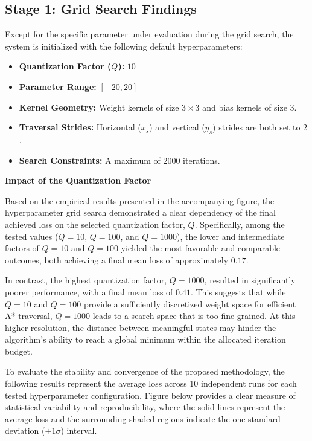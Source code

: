 \subsection{Stage 1: Grid Search Findings}

\noindent Except for the specific parameter under evaluation during the grid search, the system is initialized with the following default hyperparameters:

\begin{itemize}
    \item \textbf{Quantization Factor ($Q$):} $10$
    \item \textbf{Parameter Range:} $[-20, 20]$
    \item \textbf{Kernel Geometry:} Weight kernels of size $3 \times 3$ and bias kernels of size $3$.
    \item \textbf{Traversal Strides:} Horizontal ($x_s$) and vertical ($y_s$) strides are both set to $2$.
    \item \textbf{Search Constraints:} A maximum of $2000$ iterations.
\end{itemize}

\noindent \textbf{Impact of the Quantization Factor}

\noindent Based on the empirical results presented in the accompanying figure, the hyperparameter grid search demonstrated a clear dependency of the final achieved loss on the selected quantization factor, $Q$. Specifically, among the tested values ($Q=10$, $Q=100$, and $Q=1000$), the lower and intermediate factors of $Q=10$ and $Q=100$ yielded the most favorable and comparable outcomes, both achieving a final mean loss of approximately $0.17$. 

In contrast, the highest quantization factor, $Q=1000$, resulted in significantly poorer performance, with a final mean loss of $0.41$. This suggests that while $Q=10$ and $Q=100$ provide a sufficiently discretized weight space for efficient A* traversal, $Q=1000$ leads to a search space that is too fine-grained. At this higher resolution, the distance between meaningful states may hinder the algorithm's ability to reach a global minimum within the allocated iteration budget.

To evaluate the stability and convergence of the proposed methodology, the following results represent the average loss across 10 independent runs for each tested hyperparameter configuration. Figure below provides a clear measure of statistical variability and reproducibility, where the solid lines represent the average loss and the surrounding shaded regions indicate the one standard deviation ($\pm 1\sigma$) interval.

